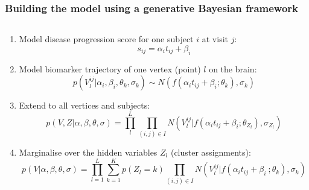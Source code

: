 \begin{frame}
\frametitle{Building the model using a generative Bayesian framework}

\begin{columns}[T]
    \begin{column}{.7\textwidth} %
   
     
   \begin{enumerate}      
      
       \item Model disease progression score for one subject $i$ at visit $j$:
      $$s_{ij} = \alpha_i t_{ij} + \beta_i$$
      
      \vspace{1em}
      
       \item Model biomarker trajectory of one vertex (point) $l$ on the brain:
       $$p(V_l^{ij} | \alpha_i, \beta_i, \theta_k, \sigma_k) \sim N(f(\alpha_i t_{ij} + \beta_i ; \theta_k), \sigma_k)$$
      
      \vspace{1em}
      
       \item Extend to all vertices and subjects:
       $$  p(V, Z | \alpha, \beta, \theta, \sigma) = \prod_l^L \prod_{(i,j) \in I} N(V_l^{ij} | f(\alpha_i t_{ij} + \beta_i ; \theta_{Z_l}), \sigma_{Z_l}) $$

      \vspace{1em}
  
       \item Marginalise over the hidden variables $Z_l$ (cluster assignments):
       \small{$$p(V|\alpha, \beta, \theta, \sigma) = \prod_{l=1}^L \sum_{k=1}^K p(Z_l = k) \prod_{(i,j) \in I} N(V_l^{ij} | f(\alpha_i t_{ij} + \beta_i \ ; \theta_k), \sigma_k)$$}
     
     \end{enumerate}
     


\end{column}
\end{columns}
\end{frame}

